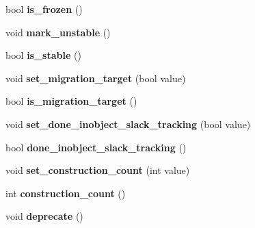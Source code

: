 \begin{DoxyCompactItemize}
\item 
\hypertarget{classv8_1_1internal_1_1_map_ae2ecc9ee735b49920f123e0c3090f31d}{}bool {\bfseries is\+\_\+frozen} ()\label{classv8_1_1internal_1_1_map_ae2ecc9ee735b49920f123e0c3090f31d}

\item 
\hypertarget{classv8_1_1internal_1_1_map_ae4c34a731c5dcbe79b61c141385b78f2}{}void {\bfseries mark\+\_\+unstable} ()\label{classv8_1_1internal_1_1_map_ae4c34a731c5dcbe79b61c141385b78f2}

\item 
\hypertarget{classv8_1_1internal_1_1_map_aff1ebc5e7fdd74fce42982006482a18c}{}bool {\bfseries is\+\_\+stable} ()\label{classv8_1_1internal_1_1_map_aff1ebc5e7fdd74fce42982006482a18c}

\item 
\hypertarget{classv8_1_1internal_1_1_map_a0de7b99b64e1110dd7e0436d0b63fbf5}{}void {\bfseries set\+\_\+migration\+\_\+target} (bool value)\label{classv8_1_1internal_1_1_map_a0de7b99b64e1110dd7e0436d0b63fbf5}

\item 
\hypertarget{classv8_1_1internal_1_1_map_a748b187a2b07d12f03955897ea52fda3}{}bool {\bfseries is\+\_\+migration\+\_\+target} ()\label{classv8_1_1internal_1_1_map_a748b187a2b07d12f03955897ea52fda3}

\item 
\hypertarget{classv8_1_1internal_1_1_map_aa570f02b642daf4324b189d57e826f48}{}void {\bfseries set\+\_\+done\+\_\+inobject\+\_\+slack\+\_\+tracking} (bool value)\label{classv8_1_1internal_1_1_map_aa570f02b642daf4324b189d57e826f48}

\item 
\hypertarget{classv8_1_1internal_1_1_map_a61317267d52b86e256a892db66c578ba}{}bool {\bfseries done\+\_\+inobject\+\_\+slack\+\_\+tracking} ()\label{classv8_1_1internal_1_1_map_a61317267d52b86e256a892db66c578ba}

\item 
\hypertarget{classv8_1_1internal_1_1_map_a3d65858344afa76537c77c5259cf023c}{}void {\bfseries set\+\_\+construction\+\_\+count} (int value)\label{classv8_1_1internal_1_1_map_a3d65858344afa76537c77c5259cf023c}

\item 
\hypertarget{classv8_1_1internal_1_1_map_a75772136fbfed4c7b1eb504c4f8c456d}{}int {\bfseries construction\+\_\+count} ()\label{classv8_1_1internal_1_1_map_a75772136fbfed4c7b1eb504c4f8c456d}

\item 
\hypertarget{classv8_1_1internal_1_1_map_a17efd28bc74d90c77c570c12d620d847}{}void {\bfseries deprecate} ()\label{classv8_1_1internal_1_1_map_a17efd28bc74d90c77c570c12d620d847}


\end{DoxyCompactItemize}

